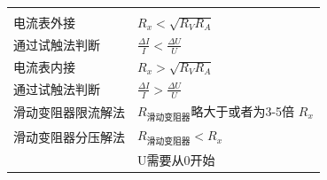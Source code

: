 \documentclass{../cheatsheet}
\begin{document}
\begin{tabularx}{\columnwidth}{XX}
	\rowcolor{blue!30}
	\multicolumn{2}{l}{\parbox[c][2.5\ht\strutbox][c]{0.9\columnwidth}{\Large 电路实验}} \\
    电流表外接&$R_x<\sqrt{R_VR_A}$\\
    通过试触法判断&$\frac{\Delta I}{I} < \frac{\Delta U}{U}$\\
    电流表内接&$R_x>\sqrt{R_VR_A}$\\
    通过试触法判断&$\frac{\Delta I}{I} > \frac{\Delta U}{U}$\\
    滑动变阻器限流解法&$R_{\text{滑动变阻器}}$略大于或者为3-5倍 $R_x$\\
    滑动变阻器分压解法&$R_{\text{滑动变阻器}}<R_x$\\
    &U需要从0开始\\
\end{tabularx}
\end{document}
